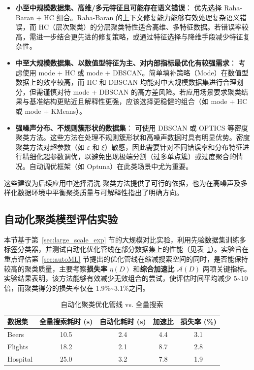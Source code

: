 \documentclass[10pt]{article} %
\numberwithin{equation}{section}
\begin{document}
\begin{itemize}
    \item \textbf{小至中规模数据集、高维/多元特征且可能存在语义错误}：
    优先选择 Raha-Baran + HC 组合。Raha-Baran 的上下文修复能力能够有效处理复杂语义错误，而 HC（层次聚类）的分层聚类特性适合高维、多特征数据。若错误率较高，需进一步结合更先进的修复策略，或通过特征选择与降维手段减少特征复杂性。

    \item \textbf{中至大规模数据集、以数值型特征为主、对内部指标最优化有较强需求}：
    考虑使用 mode + HC 或 mode + DBSCAN。简单填补策略（Mode）在数值型数据上的效率较高，而 HC 和 DBSCAN 均能对中大规模数据集进行合理划分，但需谨慎对待 mode + DBSCAN 的高方差风险。若应用场景要求聚类结果与基准结构更贴近且解释性更强，应该选择更稳健的组合（如 mode + HC 或 mode + KMeans）。

    \item \textbf{强噪声分布、不规则簇形状的数据集}：
    可使用 DBSCAN 或 OPTICS 等密度聚类方法。这些方法在处理不规则簇形状和高噪声数据时具有明显优势。密度聚类方法对超参数（如 $\varepsilon$ 和 $\xi$）敏感，因此需要针对不同错误率和分布特征进行精细化超参数调优，以避免出现极端分割（过多单点簇）或过度聚合的情况。自动调优框架（如 Optuna）在此类场景中尤为重要。
\end{itemize}

这些建议为后续应用中选择清洗-聚类方法提供了可行的依据，也为在高噪声及多样化数据环境中平衡聚类质量与可解释性指出了明确方向。

\subsection{自动化聚类模型评估实验}
\label{sec:automl_exp}
本节基于第~\ref{sec:large_scale_exp} 节的大规模对比实验，利用先验数据集训练多标签分类器，并测试自动化优化管线在部分数据集上的性能（见表~\ref{tab:autoML_res}）。实验旨在重点评估第~\ref{sec:autoML} 节提出的优化管线在缩减搜索空间的同时，是否能保持较高的聚类质量，主要考察\textbf{损失率} \(\eta(D)\) 和\textbf{综合加速比} \(\mathcal{A}(D)\) 两项关键指标。实验结果表明，该方法能够有效减少无效组合的尝试，使评估时间平均减少 5\textasciitilde10 倍，而聚类得分的损失率仅在 1.9\%\textasciitilde3.1\%之间。

\begin{table}[htbp]
\centering
\small %
\begin{tabular}{lcccc}
\toprule
\textbf{数据集} & \textbf{全量搜索耗时 (s)} & \textbf{自动化耗时 (s)} & \textbf{加速比} & \textbf{损失率 (\%)} \\
\midrule
Beers & 10.5 & 2.4 & 4.4 & 3.1 \\
Flights & 18.2 & 2.1 & 8.7 & 2.8 \\
Hospital & 25.0 & 3.2 & 7.8 & 1.9 \\
\bottomrule
\end{tabular}
\caption{自动化聚类优化管线 vs. 全量搜索}
\label{tab:autoML_res}
\end{table}
\end{document}
